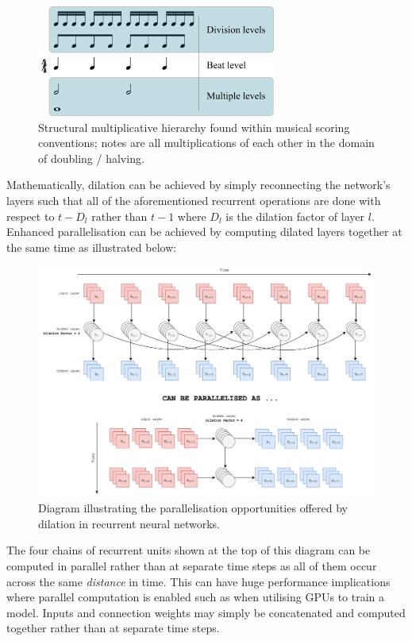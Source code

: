 \documentclass[12pt,]{article}
\begin{document}
\begin{figure}
\centering
\includegraphics[width=0.7\textwidth,height=\textheight]{Images/Metric_levels.png}
\caption{Structural multiplicative hierarchy found within musical
scoring conventions; notes are all multiplications of each other in the
domain of doubling / halving.}
\end{figure}

Mathematically, dilation can be achieved by simply reconnecting the
network's layers such that all of the aforementioned recurrent
operations are done with respect to \(t-D_l\) rather than \(t-1\) where
\(D_l\) is the dilation factor of layer \(l\). Enhanced parallelisation
can be achieved by computing dilated layers together at the same time as
illustrated below:

\begin{figure}
\centering
\includegraphics{Images/dilatedrnnparallel.png}
\caption{Diagram illustrating the parallelisation opportunities offered
by dilation in recurrent neural networks.}
\end{figure}

The four chains of recurrent units shown at the top of this diagram can
be computed in parallel rather than at separate time steps as all of
them occur across the same \emph{distance} in time. This can have huge
performance implications where parallel computation is enabled such as
when utilising GPUs to train a model. Inputs and connection weights may
simply be concatenated and computed together rather than at separate
time steps.
\end{document}
